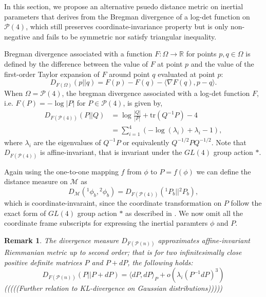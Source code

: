 \documentclass[letterpaper, 10 pt, conference]{ieeeconf}  %
\newtheorem{remark}{Remark}
\begin{document}
In this section, we propose an alternative psuedo distance metric on inertial parameters that derives from the Bregman divergence of a log-det function on $\mathcal{P}(4)$, which still preserves coordinate-invariance property but is only non-negative and fails to be symmetric nor satisfy triangular inequality.

Bregman divergence associated with a function $F: \Omega\rightarrow \mathbb{R}$ for points $p,q\in\Omega$ is defined by the difference between the value of $F$ at point $p$ and the value of the first-order Taylor expansion of $F$ around point $q$ evaluated at point $p$:
\begin{equation*}
D_{F(\Omega)}(p || q) = F(p)-F(q)-\langle\nabla F(q), p-q\rangle.
\end{equation*}
When $\Omega = \mathcal{P}(4)$, the bregman divergence associated with a log-det function $F$, i.e. $F(P) = -\log|P|$ for $P\in\mathcal{P}(4)$, is given by,
\begin{align}
D_{F(\mathcal{P}(4))}(P || Q) &= \log\frac{|Q|}{|P|} + \mathrm{tr}(Q^{-1}P) - 4\\
&= \sum_{i=1}^4(-\log(\lambda_{i})+\lambda_{i}-1),
\end{align}
where $\lambda_i$ are the eigenvalues of $Q^{-1}P$ or equivalently $Q^{-1/2}PQ^{-1/2}$. Note that $D_{F(\mathcal{P}(4))}$ is affine-invariant, that is invariant under the $GL(4)$ group action $*$.

Again using the one-to-one mapping $f$ from $\phi$ to $P = f(\phi)$ we can define the distance measure on $\mathcal{M}$ as
\begin{equation}
D_{\mathcal{M}}({^{1}}\phi_{b}, {^{2}}\phi_{b}) = D_{F(\mathcal{P}(4))}({^{1}}P_{b} ||  {^{2}}P_{b}), \label{Bregman_div}
\end{equation}
which is coordinate-invaraint, since the coordinate transformation on $P$ follow the exact form of $GL(4)$ group action $*$ as described in \cite{Taeyoon_RAL}. We now omit all the coordinate frame subscripts for expressing the inertial paramters $\phi$ and $P$.
\begin{remark}
The divergence measure $D_{F(\mathcal{P}(n))}$ approximates affine-invariant Riemmanian metric up to second order; that is for two infinitesimally close positive definite matrices $P$ and $P +dP$, the following holds:
\begin{equation*}
D_{F(\mathcal{P}(n))}(P || P+dP) = \langle dP,dP \rangle_{P} + o(\lambda_i(P^{-1}dP)^3)
\end{equation*}
(((((Further relation to KL-divergence on Gaussian distributions)))))
\end{remark}
\end{document}
